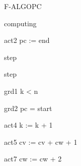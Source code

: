 \documentclass[11pt,a4paper]{article}
\begin{document}
\begin{machine}{F-ALGOPC}
\begin{event}{computing}
    \begin{action}{act2} pc := end \end{action}
  \end{event}
  \begin{event}[convergent]{step}
    \begin{refines} step \end{refines}
    \begin{guard}{grd1} k < n \end{guard}
    \begin{guard}{grd2} pc = start \end{guard}
    \begin{action}{act4} k := k + 1 \end{action}
    \begin{action}{act5} cv := cv + cw + 1 \end{action}
    \begin{action}{act7} cw := cw + 2 \end{action}
  \end{event}
\end{machine}
\end{document}
